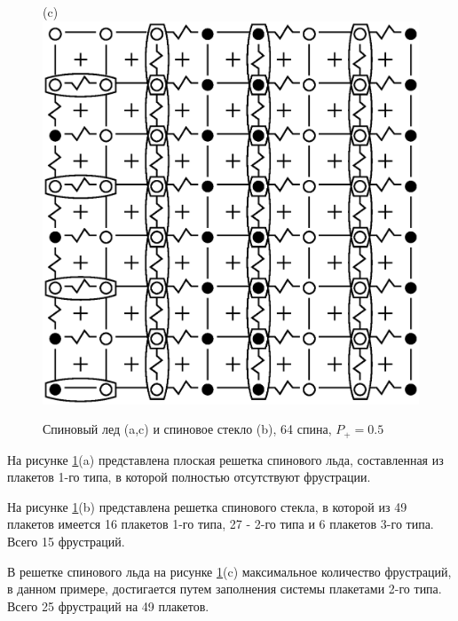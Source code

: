\documentclass[utf8, babel, sor, jor, amsmath, amssymb, reprint]{elsarticle} %
\begin{document}
\begin{figure}[H]
\begin{minipage}[h]{0.3\linewidth}
	\end{minipage}
	\hfill
	\begin{minipage}[h]{0.3\linewidth}
		\centering(c)
		\includegraphics[width=1\linewidth]{pictures/SI_64_J0}
	\end{minipage}
	\hfill
	\caption{Спиновый лед (a,c) и спиновое стекло (b), 64 спина, $P_+ = 0.5$}
	\label{fig:cell_SI_SG_64}

\end{figure}


На рисунке \ref{fig:cell_SI_SG_64}(a) представлена плоская решетка спинового льда, составленная из плакетов 1-го типа, в которой полностью отсутствуют фрустрации. 

На рисунке \ref{fig:cell_SI_SG_64}(b) представлена решетка спинового стекла, в которой из 49 плакетов имеется 16 плакетов 1-го типа, 27 - 2-го типа и 6 плакетов 3-го типа. Всего 15 фрустраций.

В решетке спинового льда на рисунке \ref{fig:cell_SI_SG_64}(c) максимальное количество фрустраций, в данном примере, достигается путем заполнения системы плакетами 2-го типа. Всего 25 фрустраций на 49 плакетов.
\end{document}
